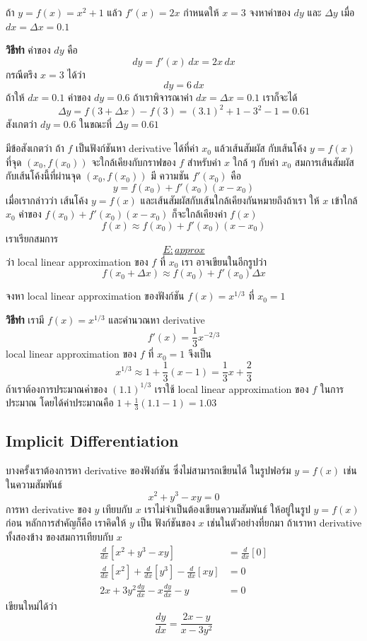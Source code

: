 \documentclass[
]{book}
\begin{document}
ถ้า \(y = f(x) = x^2+1\) แล้ว \(f'(x) = 2x\) กำหนดให้ \(x=3\) จงหาค่าของ
\(dy\) และ \(\Delta y\) เมื่อ \(dx = \Delta x = 0.1\)

\textbf{วิธีทำ} ค่าของ \(dy\) คือ \[dy = f'(x) \,dx = 2x\,dx\] กรณีตรึง
\(x=3\) ได้ว่า \[dy = 6\,dx\] ถ้าให้ \(dx=0.1\) ค่าของ \(dy = 0.6\)
ถ้าเราพิจารณาค่า \(dx = \Delta x= 0.1\) เราก็จะได้
\[\Delta y = f(3+\Delta x) - f(3) = (3.1)^2+1 - 3^2-1 = 0.61\] สังเกตว่า
\(dy = 0.6\) ในขณะที่ \(\Delta y = 0.61\)

มีข้อสังเกตว่า ถ้า \(f\) เป็นฟังก์ชันหา derivative ได้ที่ค่า \(x_0\) แล้วเส้นสัมผัส
กับเส้นโค้ง \(y= f(x)\) ที่จุด \((x_0,f(x_0))\) จะใกล้เคียงกับกราฟของ \(f\)
สำหรับค่า \(x\) ใกล้ ๆ กับค่า \(x_0\) สมการเส้นสัมผัสกับเส้นโค้งนี้ที่ผ่านจุด
\((x_0,f(x_0))\) มี ความชัน \(f'(x_0)\) คือ \[y = f(x_0) + f'(x_0)(x-x_0)\]
เมื่อเรากล่าวว่า เส้นโค้ง \(y=f(x)\) และเส้นสัมผัสกับเส้นใกล้เคียงกันหมายถึงถ้าเรา ให้
\(x\) เข้าใกล้ \(x_0\) ค่าของ \(f(x_0)+f'(x_0)(x-x_0)\) ก็จะใกล้เคียงค่า
\(f(x)\) \[\label{E:approx}
    f(x) \approx  f(x_0) + f'(x_0)(x-x_0)\]
เราเรียกสมการ~\hyperref[E:approx]{\[E:approx\]} ว่า local linear
approximation ของ \(f\) ที่ \(x_0\) เรา อาจเขียนในอีกรูปว่า
\[f(x_0 + \Delta x) \approx f(x_0) + f'(x_0)\Delta x\]

จงหา local linear approximation ของฟังก์ชัน \(f(x) = x^{1/3}\) ที่
\(x_0 = 1\)

\textbf{วิธีทำ} เรามี \(f(x) = x^{1/3}\) และคำนวณหา derivative
\[f'(x) = \frac{1}{3}x^{-2/3}\] local linear approximation ของ \(f\) ที่
\(x_0 = 1\) จึงเป็น
\[x^{1/3} \approx 1 + \frac{1}{3}(x-1) = \frac{1}{3}x+\frac{2}{3}\]
ถ้าเราต้องการประมาณค่าของ \((1.1)^{1/3}\) เราใช้ local linear approximation
ของ \(f\) ในการประมาณ โดยได้ค่าประมาณคือ \(1+\frac{1}{3}(1.1-1) = 1.03\)

\subsection{Implicit Differentiation}\label{implicit-differentiation}

บางครั้งเราต้องการหา derivative ของฟังก์ชัน ซึ่งไม่สามารถเขียนได้ ในรูปฟอร์ม
\(y = f(x)\) เช่นในความสัมพันธ์ \[x^2+y^3 - xy = 0\] การหา derivative ของ
\(y\) เทียบกับ \(x\) เราไม่จำเป็นต้องเขียนความสัมพันธ์ ให้อยู่ในรูป \(y = f(x)\) ก่อน
หลักการสำคัญก็คือ เราคิดให้ \(y\) เป็น ฟังก์ชันของ \(x\) เช่นในตัวอย่างที่ยกมา ถ้าเราหา
derivative ทั้งสองข้าง ของสมการเทียบกับ \(x\)
\begin{equation}   \begin{aligned}
    \frac{d}{dx}[x^2+y^3-xy] &= \frac{d}{dx}[0] \\
    \frac{d}{dx}[x^2] + \frac{d}{dx}[y^3] - \frac{d}{dx}[xy] &= 0 \\
    2x + 3y^2 \frac{dy}{dx} - x\frac{dy}{dx} -y &= 0
  \end{aligned} \end{equation} เขียนใหม่ได้ว่า
\[\frac{dy}{dx} = \frac{2x-y}{x-3y^2}\]
\end{document}
